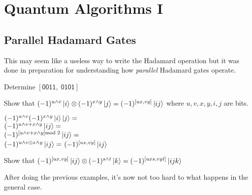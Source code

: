 
\chapter{Quantum Algorithms I}


\section{Parallel Hadamard Gates}



This may seem like a useless way to write the Hadamard operation but it was done in preparation 
for understanding how \textit{parallel} Hadamard gates operate. 




\frmrule

\begin{example}
Determine $[\textsf{0011}, \; \textsf{0101}]$ 
\end{example}



\frmrule

\begin{example}
Show that $(-1)^{u \wedge v}\left|i\right\rangle \otimes (-1)^{x \wedge y}\left|j\right\rangle = (-1)^{[ux,vy]}\left|ij\right\rangle$ 
where $u,v,x,y,i,j$ are bits.
\end{example}

\frmrule

$(-1)^{u \wedge v} (-1)^{x \wedge y} \left|i\right\rangle \left|j\right\rangle = $\\
$(-1)^{u \wedge v + x \wedge y} \left|ij\right\rangle = $\\
$(-1)^{[u \wedge v + x \wedge y]\text{mod } 2} \left|ij\right\rangle = $\\
$(-1)^{u \wedge v \oplus x \wedge y} \left|ij\right\rangle = $
$(-1)^{[ux, vy]} \left|ij\right\rangle $


\frmrule

\begin{example}
Show that $(-1)^{[ux,vy]}\left|ij\right\rangle \otimes (-1)^{s \wedge t}\left|k\right\rangle = (-1)^{[uxs,vyt]}\left|ijk\right\rangle$ 
\end{example}

\frmrule

After doing the previous examples, it's now not too hard to what happens 
in the general case. 

